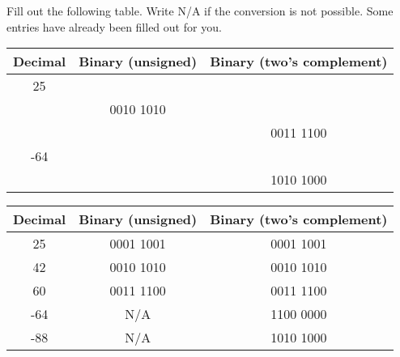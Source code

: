 \begin{blocksection}
\question Fill out the following table. Write N/A if the conversion is not possible. Some entries have already been filled out for you.

\begin{center}
  \begin{tabular}{|c|c|c|}
    \hline
    Decimal & Binary (unsigned) & Binary (two's complement) \\
    \hline\hline
    25 &  &  \\
    \hline
    & 0010 1010 & \\
    \hline
    &  & 0011 1100 \\
    \hline
    -64 &  &  \\
    \hline
    &  & 1010 1000 \\
    \hline
  \end{tabular}
\end{center}

\begin{solution}[2in]
\begin{center}
  \begin{tabular}{|c|c|c|}
    \hline
    Decimal & Binary (unsigned) & Binary (two's complement) \\
    \hline\hline
    25 & 0001 1001 & 0001 1001 \\
    \hline
    42 & 0010 1010 & 0010 1010 \\
    \hline
    60 & 0011 1100 & 0011 1100 \\
    \hline
    -64 & N/A & 1100 0000 \\
    \hline
    -88 & N/A & 1010 1000 \\
    \hline
  \end{tabular}
\end{center}
\end{solution}
\end{blocksection}
